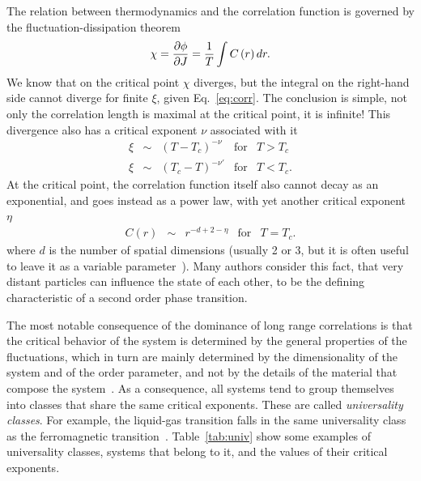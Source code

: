 The relation between thermodynamics and the correlation function is governed
by the fluctuation-dissipation theorem~\cite{Henkel2013}
\begin{equation}
    \label{eq:flucdiss}
    \chi=\frac{\partial\phi}{\partial J}=\frac{1}{T}\int C\left(r\right)dr.
\end{equation}
We know that on the critical point $\chi$ diverges, but  the integral on the
right-hand side cannot diverge for finite $\xi$, given Eq.~\ref{eq:corr}.
The conclusion is simple, not only the correlation length is maximal at the
critical point, it is infinite! This divergence also has a critical exponent
$\nu$ associated with it
\begin{equation}
    \label{eq:corlen}
    \begin{array}{ccccc}
        \xi & \sim & {\left(T-T_c\right)}^{-\nu}  & \mbox{for} & T > T_c \\
        \xi & \sim & {\left(T_c-T\right)}^{-\nu'} & \mbox{for} & T < T_c.
    \end{array}
\end{equation}
At the critical point, the correlation function itself also cannot decay as an
exponential, and goes instead as a power law, with yet another critical
exponent $\eta$
\begin{equation}
    \label{eq:critcor}
    \begin{array}{ccccc}
        C(r) & \sim & r^{-d+2-\eta} & \mbox{for} & T = T_c.
    \end{array}
\end{equation}
where $d$ is the number of spatial dimensions (usually 2 or 3, but it is often
useful to leave it as a variable parameter~\cite{Wilson1972}). 
Many authors consider this fact, that very distant particles can influence the
state of each other, to be the defining characteristic of a second order phase
transition.



The most notable consequence of the dominance of long range correlations is
that the critical behavior of the system is determined by the general
properties of the fluctuations, which in turn are mainly determined by the
dimensionality of the system and of the order parameter, and not by the details
of the material that compose the system~\cite{Stanley1999}. As a consequence,
all systems tend to group themselves into classes that share the same critical
exponents. These are called \textit{universality classes}. For example, the
liquid-gas transition falls in the same universality class as the ferromagnetic
transition~\cite{Kim1984}. Table~\ref{tab:univ} show some examples of
universality classes, systems that belong to it, and the values of their
critical exponents.


